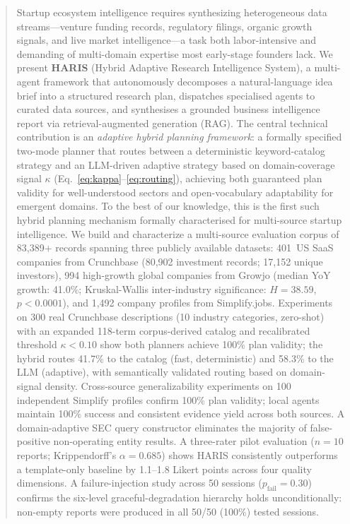 \documentclass[preprint,12pt]{elsarticle}
\begin{document}
\begin{frontmatter}
\begin{abstract}
Startup ecosystem intelligence requires synthesizing heterogeneous data
streams---venture funding records, regulatory filings, organic growth signals,
and live market intelligence---a task both labor-intensive and demanding of
multi-domain expertise most early-stage founders lack. We present \textbf{HARIS}
(Hybrid Adaptive Research Intelligence System), a multi-agent framework that
autonomously decomposes a natural-language idea brief into a structured research
plan, dispatches specialised agents to curated data sources, and synthesises a
grounded business intelligence report via retrieval-augmented generation (RAG).
The central technical contribution is an \emph{adaptive hybrid planning
framework}: a formally specified two-mode planner that routes between a
deterministic keyword-catalog strategy and an LLM-driven adaptive strategy
based on domain-coverage signal $\kappa$ (Eq.~\ref{eq:kappa}--\ref{eq:routing}),
achieving both guaranteed plan validity for well-understood sectors and
open-vocabulary adaptability for emergent domains. To the best of our knowledge,
this is the first such hybrid planning mechanism formally characterised for
multi-source startup intelligence.
We build and characterize a multi-source evaluation corpus of 83,389$+$ records
spanning three publicly available datasets: 401~US SaaS companies from Crunchbase
(80,902 investment records; 17,152 unique investors), 994 high-growth global
companies from Growjo (median YoY growth: 41.0\%; Kruskal-Wallis inter-industry
significance: $H{=}38.59$, $p{<}0.0001$), and 1,492 company profiles from
Simplify.jobs. Experiments on 300 real Crunchbase descriptions (10 industry
categories, zero-shot) with an expanded 118-term corpus-derived catalog and
recalibrated threshold $\kappa < 0.10$ show both planners achieve 100\% plan
validity; the hybrid routes 41.7\% to the catalog (fast, deterministic) and
58.3\% to the LLM (adaptive), with semantically validated routing based on
domain-signal density. Cross-source generalizability experiments on 100
independent Simplify profiles confirm 100\% plan validity; local agents maintain
100\% success and consistent evidence yield across both sources. A domain-adaptive
SEC query constructor eliminates the majority of false-positive non-operating
entity results. A three-rater pilot evaluation ($n{=}10$ reports;
Krippendorff's $\alpha{=}0.685$) shows HARIS consistently outperforms a
template-only baseline by 1.1--1.8 Likert points across four quality
dimensions. A failure-injection study across 50 sessions ($p_{\text{fail}}{=}0.30$)
confirms the six-level graceful-degradation hierarchy holds unconditionally:
non-empty reports were produced in all 50/50 (100\%) tested sessions.
\end{abstract}


\end{frontmatter}
\end{document}
